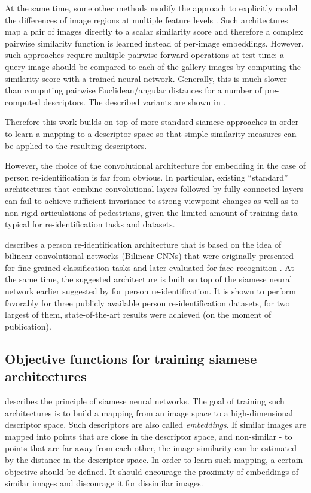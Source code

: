 At the same time, some other methods modify the approach to explicitly model the differences of image regions at multiple feature levels \citep{ahmed2015improved,Li14,chen2016deep}. Such architectures map a pair of images directly to a scalar similarity score and therefore a complex pairwise similarity function is learned instead of per-image embeddings. However, such approaches require multiple pairwise forward operations at test time: a query image should be compared to each of the gallery images by computing the similarity score with a trained neural network. Generally, this is much slower than computing pairwise Euclidean/angular distances for a number of pre-computed descriptors. The described variants are shown in .

Therefore this work builds on top of more standard siamese approaches in order to learn a mapping to a descriptor space so that simple similarity measures can be applied to the resulting descriptors.

However, the choice of the convolutional architecture for embedding in the case of person re-identification is far from obvious. In particular, existing ``standard'' architectures that combine convolutional layers followed by fully-connected layers can fail to achieve sufficient invariance to strong viewpoint changes as well as to non-rigid articulations of pedestrians, given the limited amount of training data typical for re-identification tasks and datasets. 

 describes a person re-identification architecture that is based on the idea of bilinear convolutional networks (Bilinear CNNs) \citep{lin2015bilinear} that were originally presented for fine-grained classification tasks and later evaluated for face recognition \citep{roychowdhury2015face}. At the same time, the suggested architecture is built on top of the siamese neural network earlier suggested by \citet{Yi14} for person re-identification. It is shown to perform favorably for three publicly available person re-identification datasets, for two largest of them, state-of-the-art results were achieved (on the moment of publication).



\subsection{Objective functions for training siamese architectures}
 describes the principle of siamese neural networks. The goal of training such architectures is to build a mapping from an image space to a high-dimensional descriptor space. Such descriptors are also called \textit{embeddings}. If similar images are mapped into points that are close in the descriptor space, and non-similar - to points that are far away from each other, the image similarity can be estimated by the distance in the descriptor space. In order to learn such mapping, a certain objective should be defined. It should encourage the proximity of embeddings of similar images and discourage it for dissimilar images. 

